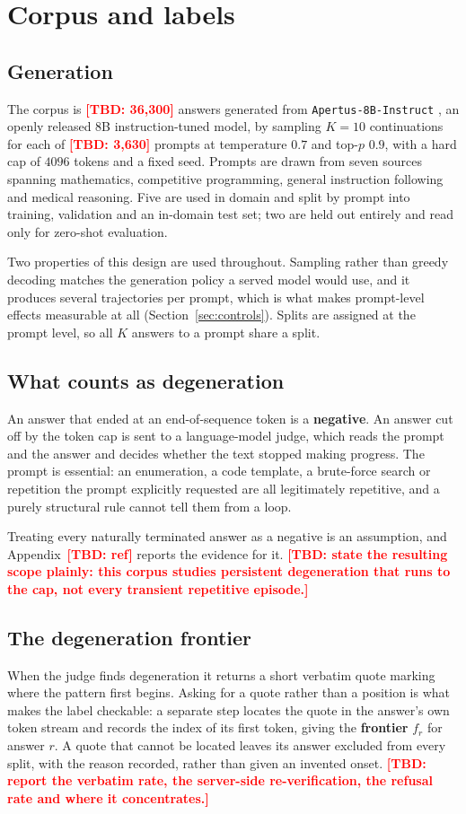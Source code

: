 \documentclass{article}
\newcommand{\TBD}[1]{\textcolor{red}{\textbf{[TBD: #1]}}}
\begin{document}
\section{Corpus and labels}
\label{sec:corpus}

\subsection{Generation}
The corpus is \TBD{36{,}300} answers generated from \texttt{Apertus-8B-Instruct}
\citep{hernandez2025apertus}, an openly released 8B instruction-tuned model, by sampling
$K=10$ continuations for each of \TBD{3{,}630} prompts at temperature $0.7$ and
top-$p$ $0.9$, with a hard cap of $4096$ tokens and a fixed seed. Prompts are
drawn from seven sources spanning mathematics, competitive programming, general
instruction following and medical reasoning. Five are used in domain and split by
prompt into training, validation and an in-domain test set; two are held out
entirely and read only for zero-shot evaluation.

Two properties of this design are used throughout. Sampling rather than greedy
decoding matches the generation policy a served model would use, and it produces
several trajectories per prompt, which is what makes prompt-level effects
measurable at all (Section~\ref{sec:controls}). Splits are assigned at the prompt
level, so all $K$ answers to a prompt share a split.

\subsection{What counts as degeneration}
An answer that ended at an end-of-sequence token is a \textbf{negative}. An
answer cut off by the token cap is sent to a language-model judge, which reads
the prompt and the answer and decides whether the text stopped making progress.
The prompt is essential: an enumeration, a code template, a brute-force search or
repetition the prompt explicitly requested are all legitimately repetitive, and a
purely structural rule cannot tell them from a loop.

Treating every naturally terminated answer as a negative is an assumption, and
Appendix~\TBD{ref} reports the evidence for it. \TBD{state the resulting scope
plainly: this corpus studies persistent degeneration that runs to the cap, not
every transient repetitive episode.}

\subsection{The degeneration frontier}
\label{sec:frontier}
When the judge finds degeneration it returns a short verbatim quote marking where
the pattern first begins. Asking for a quote rather than a position is what makes
the label checkable: a separate step locates the quote in the answer's own token
stream and records the index of its first token, giving the \textbf{frontier}
$f_r$ for answer $r$. A quote that cannot be located leaves its answer excluded
from every split, with the reason recorded, rather than given an invented onset.
\TBD{report the verbatim rate, the server-side re-verification, the refusal rate
and where it concentrates.}
\end{document}
